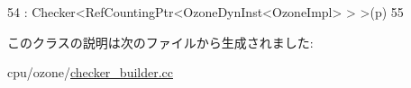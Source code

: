 \begin{DoxyCode}
54         : Checker<RefCountingPtr<OzoneDynInst<OzoneImpl> > >(p)
55     { }
\end{DoxyCode}


このクラスの説明は次のファイルから生成されました:\begin{DoxyCompactItemize}
\item 
cpu/ozone/\hyperlink{checker__builder_8cc}{checker\_\-builder.cc}\end{DoxyCompactItemize}
